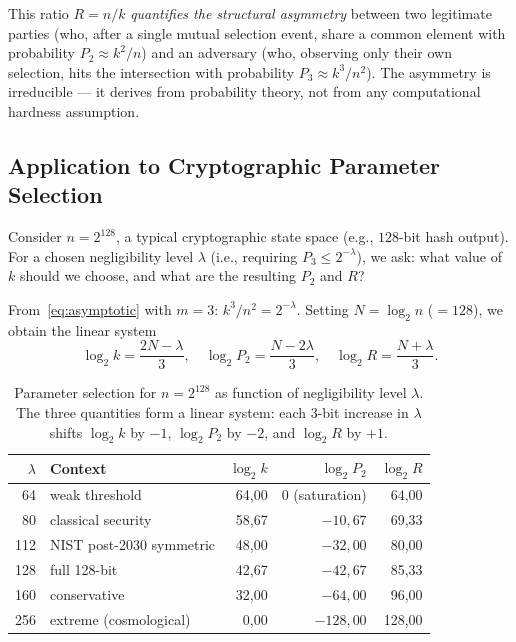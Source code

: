 \documentclass[11pt,a4paper]{article}
\begin{document}
This ratio $R = n/k$ \emph{quantifies the structural asymmetry} between two legitimate parties (who, after a single mutual selection event, share a common element with probability $P_2 \approx k^2/n$) and an adversary (who, observing only their own selection, hits the intersection with probability $P_3 \approx k^3/n^2$). The asymmetry is irreducible --- it derives from probability theory, not from any computational hardness assumption.

\subsection{Application to Cryptographic Parameter Selection}\label{sec:crypto-application}

Consider $n = 2^{128}$, a typical cryptographic state space (e.g., $128$-bit hash output). For a chosen negligibility level $\lambda$ (i.e., requiring $P_3 \leq 2^{-\lambda}$), we ask: what value of $k$ should we choose, and what are the resulting $P_2$ and $R$?

From~\eqref{eq:asymptotic} with $m = 3$: $k^3 / n^2 = 2^{-\lambda}$. Setting $N = \log_2 n$ ($= 128$), we obtain the linear system
\begin{equation}\label{eq:linear-system}
\log_2 k = \frac{2N - \lambda}{3}, \quad \log_2 P_2 = \frac{N - 2\lambda}{3}, \quad \log_2 R = \frac{N + \lambda}{3}.
\end{equation}

\begin{table}[ht]
\centering
\small
\begin{tabular}{rlrrr}
\toprule
$\lambda$ & Context & $\log_2 k$ & $\log_2 P_2$ & $\log_2 R$ \\
\midrule
64 & weak threshold & 64{,}00 & 0 (saturation) & 64{,}00 \\
80 & classical security & 58{,}67 & $-10{,}67$ & 69{,}33 \\
112 & NIST post-2030 symmetric & 48{,}00 & $-32{,}00$ & 80{,}00 \\
128 & full 128-bit & 42{,}67 & $-42{,}67$ & 85{,}33 \\
160 & conservative & 32{,}00 & $-64{,}00$ & 96{,}00 \\
256 & extreme (cosmological) & 0{,}00 & $-128{,}00$ & 128{,}00 \\
\bottomrule
\end{tabular}
\caption{Parameter selection for $n = 2^{128}$ as function of negligibility level $\lambda$. The three quantities form a linear system: each $3$-bit increase in $\lambda$ shifts $\log_2 k$ by $-1$, $\log_2 P_2$ by $-2$, and $\log_2 R$ by $+1$.}
\label{tab:lambda-tradeoff}
\end{table}
\end{document}
